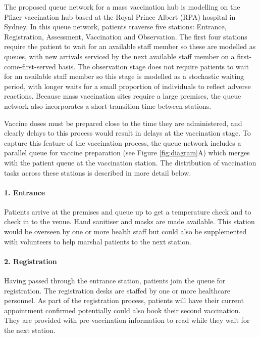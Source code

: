 \documentclass{article}
\begin{document}
The proposed queue network for a mass vaccination hub is modelling on
the Pfizer vaccination hub based at the Royal Prince Albert (RPA)
hospital in Sydney. In this queue network, patients traverse five
stations: Entrance, Registration, Assessment, Vaccination and
Observation. The first four stations require the patient to wait for an
available staff member so these are modelled as queues, with new
arrivals serviced by the next available staff member on a
first-come-first-served basis. The observation stage does not require
patients to wait for an available staff member so this stage is modelled
as a stochastic waiting period, with longer waits for a small proportion
of individuals to reflect adverse reactions. Because mass vaccination
sites require a large premises, the queue network also incorporates a
short transition time between stations.

Vaccine doses must be prepared close to the time they are administered,
and clearly delays to this process would result in delays at the
vaccination stage. To capture this feature of the vaccination process,
the queue network includes a parallel queue for vaccine preparation (see
Figure \ref{fig:diagram}A) which merges with the patient queue at the
vaccination station. The distribution of vaccination tasks across these
stations is described in more detail below.

\hypertarget{entrance}{%
\paragraph{1. Entrance}\label{entrance}}

Patients arrive at the premises and queue up to get a temperature check
and to check in to the venue. Hand sanitiser and masks are made
available. This station would be overseen by one or more health staff
but could also be supplemented with volunteers to help marshal patients
to the next station.

\hypertarget{registration}{%
\paragraph{2. Registration}\label{registration}}

Having passed through the entrance station, patients join the queue for
registration. The registration desks are staffed by one or more
healthcare personnel. As part of the registration process, patients will
have their current appointment confirmed potentially could also book
their second vaccination. They are provided with pre-vaccination
information to read while they wait for the next station.
\end{document}
